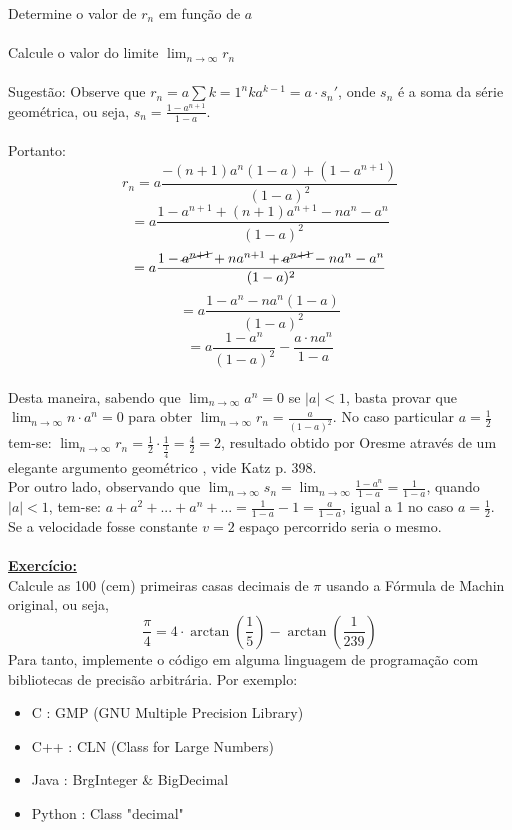 \documentclass[a4paper, 12pt]{article}
\newcommand*\circled[1]{\tikz[baseline=(char.base)]{
            \node[shape=circle,draw,inner sep=1pt] (char) {#1};}}
\begin{document}
\noindent\circled{1} Determine o valor de \(r_n\) em função de \(a\) \\ \\
\noindent\circled{2} Calcule o valor do limite \(\lim_{n \to \infty} r_n\) \\ \\
Sugestão: Observe que \(r_n = a \sum{k=1}^{n} k a^{k-1} = a \cdot s_n'\), onde \(s_n\) é a soma da série geométrica, ou seja, \(s_n = \frac{1-a^{n+1}}{1-a}\).
\\ \\
Portanto:
\[
r_n = a \frac{-(n+1) a^n (1-a) + (1-a^{n+1})}{(1-a)^2}
\]
\[
= a \frac{1-a^{n+1} + (n+1)a^{n+1} - n a^n - a^n}{(1-a)^2}
\]
\[
= a \frac{1 - \cancel{a^{n+1}} + n a^{n+1} + \cancel{a^{n+1}} - n a^n - a^n}{(1-a)^2}
\]
\[
= a \frac{1 - a^n - n a^n (1-a)}{(1-a)^2}
\]
\[
= a \frac{1-a^n}{(1-a)^2} - \frac{a \cdot n a^n}{1-a}
\]
\\
Desta maneira, sabendo que \(\lim_{n \to \infty} a^n = 0\) se \(|a| < 1\), basta provar que \(\lim_{n \to \infty} n \cdot a^n = 0\) para obter \(\lim_{n \to \infty} r_n = \frac{a}{(1-a)^2}\). No caso particular \(a = \frac{1}{2}\) tem-se: \(\lim_{n \to \infty} r_n = \frac{1}{2} \cdot \frac{1}{\frac{1}{4}} = \frac{4}{2} = 2\), resultado obtido por Oresme através de um elegante argumento geométrico , vide Katz p. 398. \\
Por outro lado, observando que \(\lim_{n \to \infty} s_n = \lim_{n \to \infty} \frac{1-a^n}{1-a} = \frac{1}{1-a}\), quando \(|a| < 1\), tem-se: \(a + a^2 + ... + a^n + ... = \frac{1}{1-a} - 1 = \frac{a}{1-a}\), igual a 1 no caso \(a = \frac{1}{2}\). \\
Se a velocidade fosse constante \(v=2\)  espaço percorrido seria o mesmo.
\\ \\
\textbf{\underline{Exercício:}} \\
Calcule as 100 (cem) primeiras casas decimais de \(\pi\) usando a Fórmula de Machin original, ou seja,
\[
\frac{\pi}{4} = 4 \cdot \arctan(\frac{1}{5}) - \arctan(\frac{1}{239})
\]
Para tanto, implemente o código em alguma linguagem de programação com bibliotecas de precisão arbitrária. Por exemplo:
\begin{itemize}
    \item C : GMP (GNU Multiple Precision Library)
    \item C++ : CLN (Class for Large Numbers)
    \item Java : BrgInteger \& BigDecimal
    \item Python : Class "decimal" 
\end{itemize}
\end{document}
